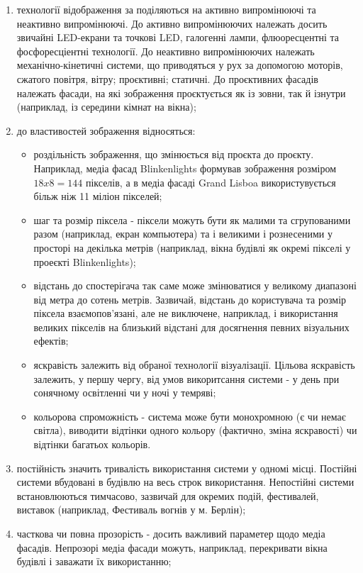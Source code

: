 \documentclass[a4paper,ukrainian,utf8,nocolumnsxix,floatsection]{eskdtext}
\begin{document}
\begin{enumerate}
	\item технології відображення за  поділяються на активно випромінюючі та неактивно випромінюючі. До активно випромінюючих належать досить звичайні LED-екрани та точкові LED, галогенні лампи, флюоресцентні та фосфоресціентні технології. До неактивно випромінюючих належать механічно-кінетичні системи, що приводяться у рух за допомогою моторів, сжатого повітря, вітру; проєктивні; статичні. До проєктивних фасадів належать фасади, на які зображення проєктується як із зовни, так й ізнутри (наприклад, із середини кімнат на вікна);
	\item до властивостей зображення відносяться:
		\begin{itemize}
			\item роздільність зображення, що змінюється від проєкта до проєкту. Наприклад, медіа фасад Blinkenlights формував зображення розміром $18x8=144$ пікселів, а в медіа фасаді Grand Lisboa використувується більж ніж 11 міліон пікселей;
			\item шаг та розмір піксела - піксели можуть бути як малими та сгрупованими разом (наприклад, екран компьютера) та і великими і рознесеними у просторі на декілька метрів (наприклад, вікна будівлі як окремі пікселі у проеєкті Blinkenlights);
			\item відстань до спостерігача так саме може змінюватися у великому диапазоні від метра до сотень метрів. Зазвичай, відстань до користувача та розмір піксела взаємопов’язані, але не виключене, наприклад, і використання великих пікселів на близький відстані для досягнення певних візуальних ефектів;
			\item яскравість залежить від обраної технології візуалізації. Цільова яскравість залежить, у першу чергу, від умов викоритсання системи - у день при сонячному освітленні чи у ночі у темряві;
			\item кольорова спроможність - система може бути монохромною (є чи немає світла), виводити відтінки одного кольору (фактично, зміна яскравості) чи відтінки багатьох кольорів.
		\end{itemize}
	\item постійність значить тривалість використання системи у одномі місці. Постійні системи вбудовані в будівлю на весь строк використання. Непостійні системи встановлюються тимчасово, зазвичай для окремих подій, фестивалей, виставок (наприклад, Фестиваль вогнів у м. Берлін);
	\item часткова чи повна прозорість - досить важливий параметер щодо медіа фасадів. Непрозорі медіа фасади можуть, наприклад, перекривати вікна будівлі і заважати їх використанню;

\end{enumerate}
\end{document}
